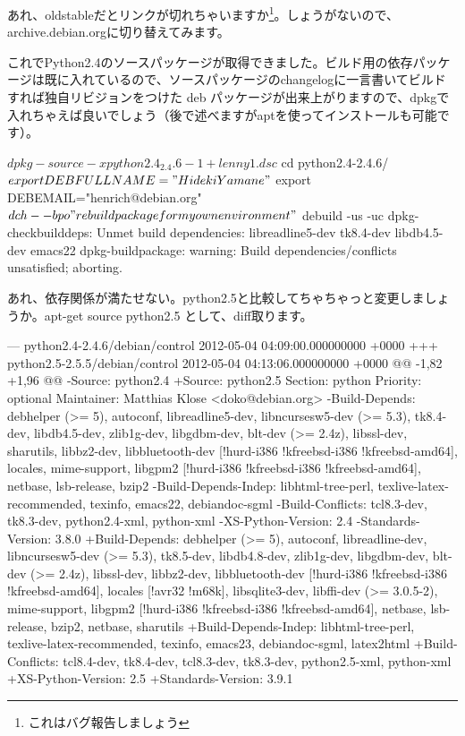 \documentclass[mingoth,a4paper]{jsarticle}
\begin{document}
あれ、oldstableだとリンクが切れちゃいますか\footnote{これはバグ報告しましょう}。しょうがないので、archive.debian.orgに切り替えてみます。

これでPython2.4のソースパッケージが取得できました。ビルド用の依存パッケージは既に入れているので、ソースパッケージのchangelogに一言書いてビルドすれば独自リビジョンをつけた deb パッケージが出来上がりますので、dpkgで入れちゃえば良いでしょう（後で述べますがaptを使ってインストールも可能です）。

\begin{commandline}
$ dpkg-source -x python2.4_2.4.6-1+lenny1.dsc
$ cd python2.4-2.4.6/
$ export DEBFULLNAME="Hideki Yamane"
$ export DEBEMAIL="henrich@debian.org"
$ dch --bpo "rebuild package for my own environment"
$ debuild -us -uc
dpkg-checkbuilddeps: Unmet build dependencies: libreadline5-dev tk8.4-dev libdb4.5-dev emacs22
dpkg-buildpackage: warning: Build dependencies/conflicts unsatisfied; aborting.
\end{commandline}

あれ、依存関係が満たせない。python2.5と比較してちゃちゃっと変更しましょうか。apt-get source python2.5 として、diff取ります。

\begin{commandline}
--- python2.4-2.4.6/debian/control	2012-05-04 04:09:00.000000000 +0000
+++ python2.5-2.5.5/debian/control	2012-05-04 04:13:06.000000000 +0000
@@ -1,82 +1,96 @@
-Source: python2.4
+Source: python2.5
 Section: python
 Priority: optional
 Maintainer: Matthias Klose <doko@debian.org>
-Build-Depends: debhelper (>= 5), autoconf, libreadline5-dev, libncursesw5-dev (>= 5.3), tk8.4-dev, libdb4.5-dev, zlib1g-dev, 
libgdbm-dev, blt-dev (>= 2.4z), libssl-dev, sharutils, libbz2-dev, libbluetooth-dev [!hurd-i386 !kfreebsd-i386 
!kfreebsd-amd64], locales, mime-support, libgpm2 [!hurd-i386 !kfreebsd-i386 !kfreebsd-amd64], netbase, lsb-release, bzip2
-Build-Depends-Indep: libhtml-tree-perl, texlive-latex-recommended, texinfo, emacs22, debiandoc-sgml
-Build-Conflicts: tcl8.3-dev, tk8.3-dev, python2.4-xml, python-xml
-XS-Python-Version: 2.4
-Standards-Version: 3.8.0
+Build-Depends: debhelper (>= 5), autoconf, libreadline-dev, libncursesw5-dev (>= 5.3), tk8.5-dev, libdb4.8-dev, zlib1g-dev, 
libgdbm-dev, blt-dev (>= 2.4z), libssl-dev, libbz2-dev, libbluetooth-dev [!hurd-i386 !kfreebsd-i386 !kfreebsd-amd64], 
locales [!avr32 !m68k], libsqlite3-dev, libffi-dev (>= 3.0.5-2), mime-support, libgpm2 [!hurd-i386 !kfreebsd-i386
 !kfreebsd-amd64], netbase, lsb-release, bzip2, netbase, sharutils
+Build-Depends-Indep: libhtml-tree-perl, texlive-latex-recommended, texinfo, emacs23, debiandoc-sgml, latex2html
+Build-Conflicts: tcl8.4-dev, tk8.4-dev, tcl8.3-dev, tk8.3-dev, python2.5-xml, python-xml
+XS-Python-Version: 2.5
+Standards-Version: 3.9.1
\end{commandline}
\end{document}
